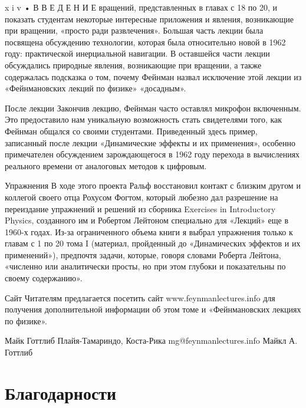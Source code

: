 \documentclass[11pt,oneside]{article}
\begin{document}
x i v • В В Е Д Е Н И Е вращений, представленных в главах с 18 по 20, и показать студентам некоторые интересные приложения и явления, возникающие при вращении, «просто ради развлечения». Большая часть лекции была посвящена обсуждению технологии, которая была относительно новой в 1962 году: практической инерциальной навигации. В оставшейся части лекции обсуждались природные явления, возникающие при вращении, а также содержалась подсказка о том, почему Фейнман назвал исключение этой лекции из «Фейнмановских лекций по физике» «досадным».\par



После лекции Закончив лекцию, Фейнман часто оставлял микрофон включенным. Это предоставило нам уникальную возможность стать свидетелями того, как Фейнман общался со своими студентами. Приведенный здесь пример, записанный после лекции «Динамические эффекты и их применения», особенно примечателен обсуждением зарождающегося в 1962 году перехода в вычислениях реального времени от аналоговых методов к цифровым.\par



Упражнения В ходе этого проекта Ральф восстановил контакт с близким другом и коллегой своего отца Рохусом Фогтом, который любезно дал разрешение на переиздание упражнений и решений из сборника Exercises in Introductory Physics, созданного им и Робертом Лейтоном специально для «Лекций» еще в 1960-х годах. Из-за ограниченного объема книги я выбрал упражнения только к главам с 1 по 20 тома I (материал, пройденный до «Динамических эффектов и их применений»), предпочтя задачи, которые, говоря словами Роберта Лейтона, «численно или аналитически просты, но при этом глубоки и показательны по своему содержанию».\par



Сайт Читателям предлагается посетить сайт www.feynmanlectures.info для получения дополнительной информации об этом томе и «Фейнмановских лекциях по физике».\par



Майк Готтлиб Плайя-Тамариндо, Коста-Рика mg@feynmanlectures.info Майкл А. Готтлиб\par



\clearpage


\section*{Благодарности}
\end{document}
